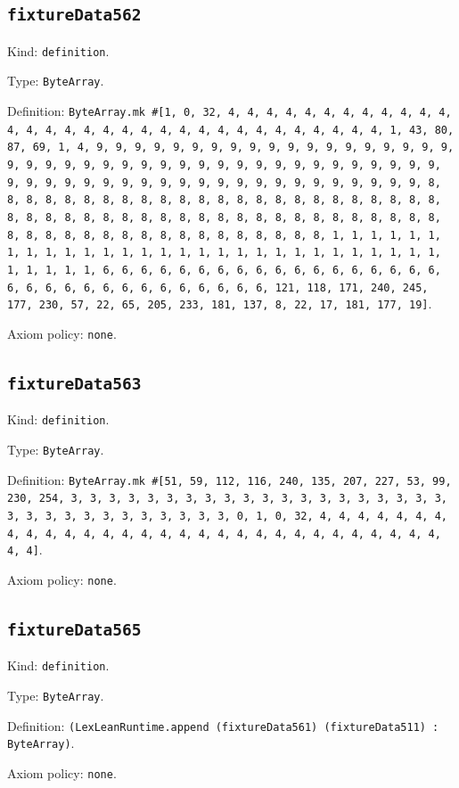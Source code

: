 \documentclass[11pt]{article}
\begin{document}
\subsection*{\texttt{fixtureData562}}
\noindent Kind: \texttt{definition}.\par
\noindent Type: \texttt{ByteArray}.\par
\noindent Definition: \texttt{ByteArray.mk \#[1, 0, 32, 4, 4, 4, 4, 4, 4, 4, 4, 4, 4, 4, 4, 4, 4, 4, 4, 4, 4, 4, 4, 4, 4, 4, 4, 4, 4, 4, 4, 4, 4, 4, 4, 1, 43, 80, 87, 69, 1, 4, 9, 9, 9, 9, 9, 9, 9, 9, 9, 9, 9, 9, 9, 9, 9, 9, 9, 9, 9, 9, 9, 9, 9, 9, 9, 9, 9, 9, 9, 9, 9, 9, 9, 9, 9, 9, 9, 9, 9, 9, 9, 9, 9, 9, 9, 9, 9, 9, 9, 9, 9, 9, 9, 9, 9, 9, 9, 9, 9, 9, 9, 9, 9, 9, 8, 8, 8, 8, 8, 8, 8, 8, 8, 8, 8, 8, 8, 8, 8, 8, 8, 8, 8, 8, 8, 8, 8, 8, 8, 8, 8, 8, 8, 8, 8, 8, 8, 8, 8, 8, 8, 8, 8, 8, 8, 8, 8, 8, 8, 8, 8, 8, 8, 8, 8, 8, 8, 8, 8, 8, 8, 8, 8, 8, 8, 8, 8, 8, 1, 1, 1, 1, 1, 1, 1, 1, 1, 1, 1, 1, 1, 1, 1, 1, 1, 1, 1, 1, 1, 1, 1, 1, 1, 1, 1, 1, 1, 1, 1, 1, 1, 1, 6, 6, 6, 6, 6, 6, 6, 6, 6, 6, 6, 6, 6, 6, 6, 6, 6, 6, 6, 6, 6, 6, 6, 6, 6, 6, 6, 6, 6, 6, 6, 6, 121, 118, 171, 240, 245, 177, 230, 57, 22, 65, 205, 233, 181, 137, 8, 22, 17, 181, 177, 19]}.\par
\noindent Axiom policy: \texttt{none}.\par
\subsection*{\texttt{fixtureData563}}
\noindent Kind: \texttt{definition}.\par
\noindent Type: \texttt{ByteArray}.\par
\noindent Definition: \texttt{ByteArray.mk \#[51, 59, 112, 116, 240, 135, 207, 227, 53, 99, 230, 254, 3, 3, 3, 3, 3, 3, 3, 3, 3, 3, 3, 3, 3, 3, 3, 3, 3, 3, 3, 3, 3, 3, 3, 3, 3, 3, 3, 3, 3, 3, 3, 3, 0, 1, 0, 32, 4, 4, 4, 4, 4, 4, 4, 4, 4, 4, 4, 4, 4, 4, 4, 4, 4, 4, 4, 4, 4, 4, 4, 4, 4, 4, 4, 4, 4, 4, 4, 4]}.\par
\noindent Axiom policy: \texttt{none}.\par
\subsection*{\texttt{fixtureData565}}
\noindent Kind: \texttt{definition}.\par
\noindent Type: \texttt{ByteArray}.\par
\noindent Definition: \texttt{(LexLeanRuntime.append (fixtureData561) (fixtureData511) : ByteArray)}.\par
\noindent Axiom policy: \texttt{none}.\par
\end{document}
